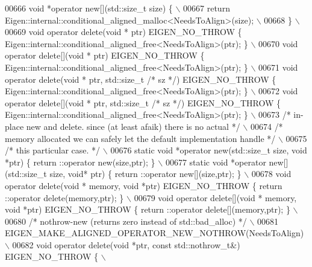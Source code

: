 \begin{DoxyCode}
00666 \textcolor{preprocessor}{      void *operator new[](std::size\_t size) \{ \(\backslash\)}
00667 \textcolor{preprocessor}{        return Eigen::internal::conditional\_aligned\_malloc<NeedsToAlign>(size); \(\backslash\)}
00668 \textcolor{preprocessor}{      \} \(\backslash\)}
00669 \textcolor{preprocessor}{      void operator delete(void * ptr) EIGEN\_NO\_THROW \{
       Eigen::internal::conditional\_aligned\_free<NeedsToAlign>(ptr); \} \(\backslash\)}
00670 \textcolor{preprocessor}{      void operator delete[](void * ptr) EIGEN\_NO\_THROW \{
       Eigen::internal::conditional\_aligned\_free<NeedsToAlign>(ptr); \} \(\backslash\)}
00671 \textcolor{preprocessor}{      void operator delete(void * ptr, std::size\_t }\textcolor{comment}{/* sz */}\textcolor{preprocessor}{) EIGEN\_NO\_THROW \{
       Eigen::internal::conditional\_aligned\_free<NeedsToAlign>(ptr); \} \(\backslash\)}
00672 \textcolor{preprocessor}{      void operator delete[](void * ptr, std::size\_t }\textcolor{comment}{/* sz */}\textcolor{preprocessor}{) EIGEN\_NO\_THROW \{
       Eigen::internal::conditional\_aligned\_free<NeedsToAlign>(ptr); \} \(\backslash\)}
00673 \textcolor{preprocessor}{      }\textcolor{comment}{/* in-place new and delete. since (at least afaik) there is no actual   */}\textcolor{preprocessor}{ \(\backslash\)}
00674 \textcolor{preprocessor}{      }\textcolor{comment}{/* memory allocated we can safely let the default implementation handle */}\textcolor{preprocessor}{ \(\backslash\)}
00675 \textcolor{preprocessor}{      }\textcolor{comment}{/* this particular case. */}\textcolor{preprocessor}{ \(\backslash\)}
00676 \textcolor{preprocessor}{      static void *operator new(std::size\_t size, void *ptr) \{ return ::operator new(size,ptr); \} \(\backslash\)}
00677 \textcolor{preprocessor}{      static void *operator new[](std::size\_t size, void* ptr) \{ return ::operator new[](size,ptr); \} \(\backslash\)}
00678 \textcolor{preprocessor}{      void operator delete(void * memory, void *ptr) EIGEN\_NO\_THROW \{ return ::operator delete(memory,ptr);
       \} \(\backslash\)}
00679 \textcolor{preprocessor}{      void operator delete[](void * memory, void *ptr) EIGEN\_NO\_THROW \{ return ::operator
       delete[](memory,ptr); \} \(\backslash\)}
00680 \textcolor{preprocessor}{      }\textcolor{comment}{/* nothrow-new (returns zero instead of std::bad\_alloc) */}\textcolor{preprocessor}{ \(\backslash\)}
00681 \textcolor{preprocessor}{      EIGEN\_MAKE\_ALIGNED\_OPERATOR\_NEW\_NOTHROW(NeedsToAlign) \(\backslash\)}
00682 \textcolor{preprocessor}{      void operator delete(void *ptr, const std::nothrow\_t&) EIGEN\_NO\_THROW \{ \(\backslash\)}

\end{DoxyCode}
